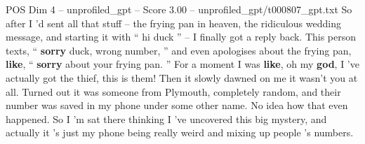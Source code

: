 \begin{textsample}{POS Dim 4 – unprofiled\_gpt – Score 3.00 – unprofiled\_gpt/t000807\_gpt.txt}  \label{ex:f4_pos_025}
So after I ’d sent all that stuff – the frying pan in heaven, the ridiculous wedding message, and starting it with “ hi duck ” – I finally got a reply back.
This person texts, “ \textbf{sorry} duck, wrong number, ” and even apologises about the frying pan, \textbf{like}, “ \textbf{sorry} about your frying pan. ” For a moment I was \textbf{like}, oh my \textbf{god}, I ’ve actually got the thief, this is them!
Then it slowly dawned on me it wasn't you at all.
Turned out it was someone from Plymouth, completely random, and their number was saved in my phone under some other name.
No idea how that even happened.
So I ’m sat there thinking I ’ve uncovered this big mystery, and actually it ’s just my phone being really weird and mixing up people ’s numbers.

\end{textsample}
